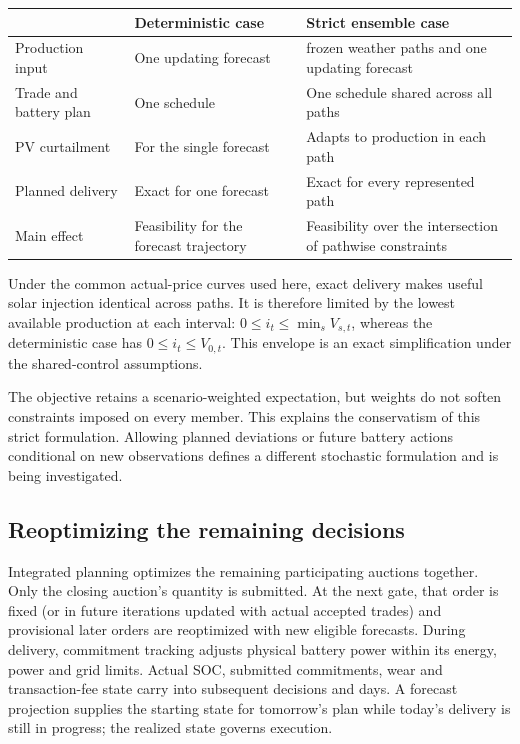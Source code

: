 \documentclass[11pt,a4paper]{article}
\begin{document}
\begin{center}\small
\begin{tabular}{>{\raggedright\arraybackslash}p{}
                >{\raggedright\arraybackslash}p{}
                >{\raggedright\arraybackslash}p{}}
\toprule & Deterministic case & Strict ensemble case\\\midrule
Production input & One updating forecast & 50 frozen weather paths and one updating forecast\\
Trade and battery plan & One schedule & One schedule shared across all paths\\
PV curtailment & For the single forecast & Adapts to production in each path\\
Planned delivery & Exact for one forecast & Exact for every represented path\\
Main effect & Feasibility for the forecast trajectory & Feasibility over the intersection of pathwise constraints\\
\bottomrule\end{tabular}\end{center}

Under the common actual-price curves used here, exact delivery makes useful
solar injection identical across paths. It is therefore limited by the lowest
available production at each interval: $0\le i_t\le\min_sV_{s,t}$, whereas the
deterministic case has $0\le i_t\le V_{0,t}$. This envelope is an exact
simplification under the shared-control assumptions. 

The objective retains a scenario-weighted expectation, but weights do not
soften constraints imposed on every member.
This explains the conservatism of this strict formulation. Allowing planned
deviations or future battery actions conditional on new observations defines
a different stochastic formulation and is being investigated.

\subsection{Reoptimizing the remaining decisions}

Integrated planning optimizes the remaining participating auctions together.
Only the closing auction's quantity is submitted. At the next gate, that order
is fixed (or in future iterations updated with actual accepted trades)
 and provisional later orders are reoptimized with new eligible
forecasts. During delivery, commitment tracking adjusts physical battery power
within its energy, power and grid limits. Actual SOC, submitted commitments,
wear and transaction-fee state carry into subsequent decisions and days. A
forecast projection supplies the starting state for tomorrow's plan while
today's delivery is still in progress; the realized state governs execution.
\end{document}
